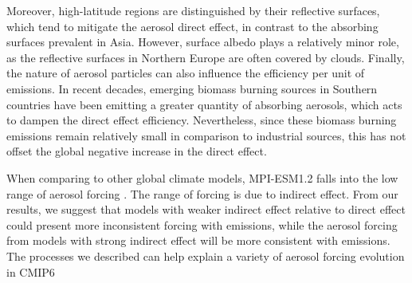 \documentclass[draft]{agujournal2019}
\begin{document}
      Moreover, high-latitude regions are distinguished by their reflective surfaces, which tend to mitigate the aerosol direct effect, in contrast to the absorbing surfaces prevalent in Asia. However, surface albedo plays a relatively minor role, as the reflective surfaces in Northern Europe are often covered by clouds.
      Finally, the nature of aerosol particles can also influence the efficiency per unit of emissions. In recent decades, emerging biomass burning sources in Southern countries have been emitting a greater quantity of absorbing aerosols, which acts to dampen the direct effect efficiency. Nevertheless, since these biomass burning emissions remain relatively small in comparison to industrial sources, this has not offset the global negative increase in the direct effect.

      When comparing to other global climate models, MPI-ESM1.2 falls into the low range of aerosol forcing \cite{Fiedler_2023}. The range of forcing is due to indirect effect. From our results, we suggest that models with weaker indirect effect relative to direct effect could present more inconsistent forcing with emissions, while the aerosol forcing from models with strong indirect effect will be more consistent with emissions. 
      The processes we described can help explain a variety of aerosol forcing evolution in CMIP6
      



%
%
\end{document}

